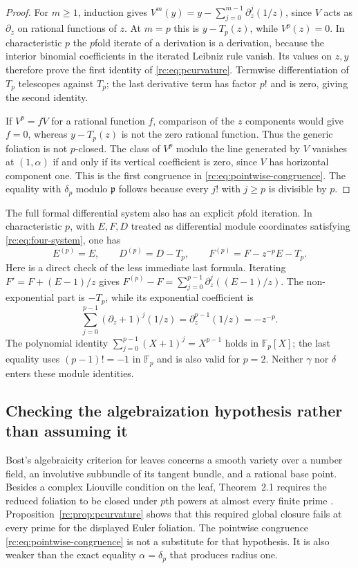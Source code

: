 \documentclass[11pt,a4paper]{article}
\theoremstyle{definition}
\theoremstyle{remark}
\theoremstyle{plain}
\numberwithin{equation}{section}
\begin{document}
\begin{proof}
For $m\ge1$, induction gives
$V^m(y)=y-\sum_{j=0}^{m-1}\partial_z^j(1/z)$, since $V$ acts as
$\partial_z$ on rational functions of $z$.  At $m=p$ this is
$y-T_p(z)$, while $V^p(z)=0$.  In characteristic $p$ the $p$fold
iterate of a derivation is a derivation, because the interior binomial
coefficients in the iterated Leibniz rule vanish.  Its values on $z,y$
therefore prove the first identity of \eqref{rc:eq:pcurvature}.
Termwise differentiation of $T_p$ telescopes against $T_p$; the last
derivative term has factor $p!$ and is zero, giving the second identity.

If $V^p=fV$ for a rational function $f$, comparison of the $z$ components
would give $f=0$, whereas $y-T_p(z)$ is not the zero rational function.
Thus the generic foliation is not $p$-closed.  The class of $V^p$
modulo the line generated by $V$ vanishes at $(1,\alpha)$ if and only
if its vertical coefficient is zero, since $V$ has horizontal component
one.  This is the first congruence in
\eqref{rc:eq:pointwise-congruence}.  The equality with $\delta_p$
modulo $\mathfrak p$ follows because every $j!$ with $j\ge p$ is
divisible by $p$.
\end{proof}

The full formal differential system also has an explicit $p$fold
iteration.  In characteristic $p$, with $E,F,D$ treated as differential
module coordinates satisfying \eqref{rc:eq:four-system}, one has
\begin{equation}\label{rc:eq:full-p-iteration}
 E^{(p)}=E,\qquad D^{(p)}=D-T_p,
 \qquad F^{(p)}=F-z^{-p}E-T_p.
\end{equation}
Here is a direct check of the less immediate last formula.  Iterating
$F'=F+(E-1)/z$ gives
$F^{(p)}-F=\sum_{j=0}^{p-1}\partial_z^j((E-1)/z)$.
The non-exponential part is $-T_p$, while its exponential coefficient is
\[
 \sum_{j=0}^{p-1}(\partial_z+1)^j(1/z)
 =\partial_z^{p-1}(1/z)=-z^{-p}.
\]
The polynomial identity
$\sum_{j=0}^{p-1}(X+1)^j=X^{p-1}$ holds in $\mathbb F_p[X]$;
the last equality uses $(p-1)!=-1$ in $\mathbb F_p$ and is also valid
for $p=2$.  Neither $\gamma$ nor $\delta$ enters these module identities.

\subsection{Checking the algebraization hypothesis rather than assuming it}

Bost's algebraicity criterion for leaves concerns a smooth variety over
a number field, an involutive subbundle of its tangent bundle, and a
rational base point.  Besides a complex Liouville condition on the leaf,
Theorem~2.1 requires the reduced foliation to be closed under $p$th
powers at almost every finite prime \cite[Theorem 2.1]{rc:bost}.
Proposition~\ref{rc:prop:pcurvature} shows that this required global
closure fails at every prime for the displayed Euler foliation.  The
pointwise congruence \eqref{rc:eq:pointwise-congruence} is not a
substitute for that hypothesis.  It is also weaker than the exact
equality $\alpha=\delta_p$ that produces radius one.
\end{document}
